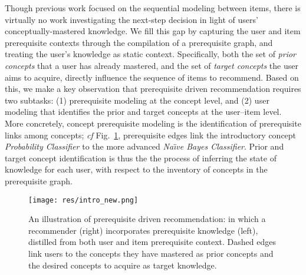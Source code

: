 Though previous work \cite{hidasi2015session} focused on the sequential modeling between items, there is virtually no work investigating the next-step decision in light of users' conceptually-mastered knowledge. We fill this gap by capturing
the user and item prerequisite contexts through the compilation of a prerequisite graph, and treating the user's knowledge as static context.
Specifically, both the set of {\it prior concepts} that a user has already mastered, and the set of {\it target concepts} the user aims to acquire, directly influence the sequence of items to recommend.
Based on this, we make a key observation that prerequisite driven recommendation requires two subtasks: (1) prerequisite modeling at the concept level, 
and (2) user modeling that identifies the prior and target concepts at the user--item level. 
More concretely, concept prerequisite modeling is the identification of prerequisite links among concepts; {\it cf} Fig.~\ref{fig:example}, prerequisite edges link the introductory concept {\it Probability Classifier} to the more advanced {\it Na\"{\i}ve Bayes Classifier}. Prior and target concept identification is thus the the process of inferring the state of knowledge for each user, with respect to the inventory of concepts in the prerequisite graph. 

\begin{figure}[t!]
\setlength{\abovecaptionskip}{-0.01cm}
\setlength{\belowcaptionskip}{-0.6cm}
\centering
\texttt{[image: res/intro\_new.png]}
\caption{An illustration of prerequisite driven recommendation: in which a recommender (right) incorporates prerequisite knowledge (left), distilled from both user and item prerequisite context.
Dashed edges link users to the concepts they have mastered as prior concepts and the desired concepts to acquire as target knowledge. }
\label{fig:example}
\end{figure}

